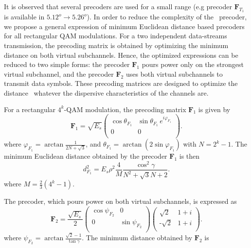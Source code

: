 It is observed that several precoders are used for a small range (e.g precoder $\mathbf{F}_{T_1}$ is available in $5.12^o \rightarrow 5.26^o$). In order to reduce the complexity of the \maxdmin\ precoder, we propose a general expression of minimum Euclidean distance based precoders for all rectangular QAM modulations. For a two independent data-streams transmission, the precoding matrix is obtained by optimizing the minimum distance on both virtual subchannels. Hence, the optimized expressions can be reduced to two simple forms: the precoder $\mathbf{F}_1$ pours power only on the strongest virtual subchannel, and the precoder $\mathbf{F}_2$ uses  both virtual subchannels to transmit data symbols. These precoding matrices are designed to optimize the distance \dmin\ whatever the dispersive characteristics of the channels are. 

For a rectangular $4^k$-QAM modulation, the precoding matrix $\mathbf{F}_1$ is given by
\begin{equation}
\label{eq_ab3_F1}
\mathbf{F}_1 = \sqrt{E_s}
		\begin{pmatrix}
			\cos \theta_{F_1} & \sin \theta_{F_1} \, e^{i\varphi_{F_1}}  \\
			0 & 0 \\
		\end{pmatrix} .
\end{equation} 
where $\varphi_{F_{1}}= \arctan \frac{1}{2N+\sqrt{3}}$, and $\theta_{F_{1}} = \arctan (2\sin \varphi_{F_{1}})$ with $N = 2^k-1$. The minimum Euclidean distance obtained by the precoder $\mathbf{F}_1$ is then
\begin{equation}
\label{dmin_F1}
	d^2_{F_{1}} = E_s \rho^2 \frac{4}{M} \frac{\cos^2\gamma}{N^2 + \sqrt{3}N + 2} .
\end{equation}
where $M=\frac{2}{3}(4^k-1)$. 

The precoder, which pours power on both virtual subchannels, is expressed as
\begin{equation}
\label{eq_ab3_F2}
\mathbf{F}_2 =  \frac{\sqrt{E_s}}{2}
		\begin{pmatrix}
			\cos \psi_{F_2} & 0  \\
			0 & \sin \psi_{F_2} \\
		\end{pmatrix}
		\begin{pmatrix}
			\sqrt{2} & 1+i  \\
			\text{-}\sqrt{2} & 1+i \\
		\end{pmatrix} .
\end{equation} 
where $\psi_{F_{2}}=\arctan \frac{\sqrt{2}-1}{\tan \gamma}$. The minimum distance obtained by $\mathbf{F}_2$ is

